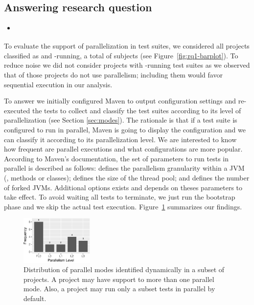 \subsection{Answering research question \numRQC{}}
\label{sec:rqC}

\begin{itemize}
    \item \emph{\RQC}
\end{itemize}

To evaluate the support of parallelization in test suites, we
considered all projects classified as \medg{} and \longg{}-running, a
total of \numMedLong{} subjects (see Figure~\ref{fig:rq1-barplot}). To
reduce noise we did not consider projects with \shortg{}-running test
suites as we observed that \percentShortSequential{} of those projects
do not use parallelism; including them would favor sequential
execution in our analysis.

To answer \numRQC{} we initially configured Maven to output
configuration settings and re-executed the tests to collect and
classify the test suites according to its level of parallelization
(see Section \ref{sec:modes}).  The rationale is that if a test suite
is configured to run in parallel, Maven is going to display the
configuration and we can classify it according to its parallelization
level.  We are interested to know how frequent are parallel executions
and what configurations are more popular.  According to Maven's
documentation, the set of parameters to run
tests in parallel is described as follows:  defines
the parallelism granularity within a JVM (\eg, methods or classes);
 defines the size of the thread pool; and
 defines the number of forked JVMs. Additional
options exists and depends on theses parameters to take effect. To
avoid waiting all tests to terminate, we just run the bootstrap phase
and we skip the actual test execution. 
Figure~\ref{fig:freqmodes-dynamic} summarizes our findings.

\begin{figure}[h!]
    \centering
    \includegraphics[width=0.32\textwidth]{plots/barplot-modes-dynamic.pdf}
    \caption{\label{fig:freqmodes-dynamic}Distribution of parallel modes 
    identified dynamically in a subset of \numProjectsPar{} projects.
    A project may have support to more than one parallel mode. Also,
    a project may run only a subset tests in parallel by default.}
\end{figure}

